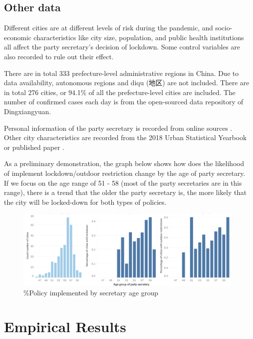 \documentclass{article}
\begin{document}
\begin{CJK}{UTF8}{gbsn}
\subsection{Other data} 
Different cities are at different levels of risk during the pandemic, and socio-economic characteristics like city size, population, and public health institutions all affect the party secretary's decision of lockdown. Some control variables are also recorded to rule out their effect.

There are in total 333 prefecture-level administrative regions in China. Due to data availability, autonomous regions and diqu (地区) are not included. There are in total 276 cities, or 94.1\% of all the prefecture-level cities are included. The number of confirmed cases each day is from the open-sourced data repository of Dingxiangyuan. 

Personal information of the party secretary is recorded from online sources \cite{wiki, official info}. Other city characteristics are recorded from the 2018 Urban Statistical Yearbook or published paper \cite{xichen}.

As a preliminary demonstration, the graph below shows how does the likelihood of implement lockdown/outdoor restriction change by the age of party secretary. If we focus on the age range of 51 - 58 (most of the party secretaries are in this range), there is a trend that the older the party secretary is, the more likely that the city will be locked-down for both types of policies.


\begin{figure}[H] %
\centering %
\includegraphics[width=1\textwidth]{graphs/age_group_avg} %
\caption{\%Policy implemented by secretary age group} %
\label{fig.1} %
\end{figure}


\section{Empirical Results} 


\end{CJK}
\end{document}
